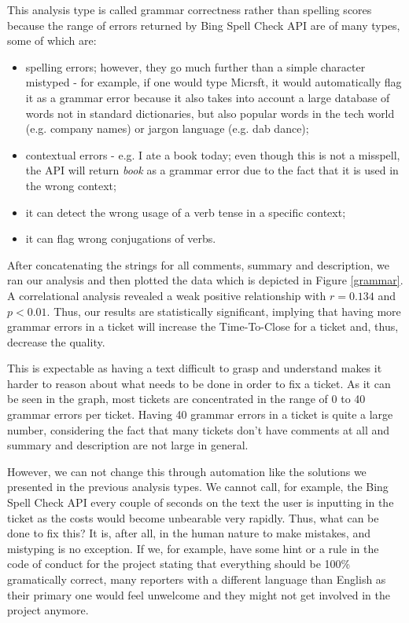 \documentclass{mpaper}
\begin{document}
This analysis type is called grammar correctness rather than spelling scores because the range of errors returned 
by Bing Spell Check API are of many types, some of which are:
\begin{itemize}
  \item spelling errors; however, they go much further than a simple character mistyped - for example,
  if one would type Micrsft, it would automatically flag it as a grammar error because it also takes into account a large 
  database of words not in standard dictionaries, but also popular words in the tech world (e.g. company names) or 
  jargon language (e.g. dab dance);
  \item contextual errors - e.g. I ate a book today; even though this is not a misspell, the API will return \emph{book} as 
  a grammar error due to the fact that it is used in the wrong context;
  \item it can detect the wrong usage of a verb tense in a specific context;
  \item it can flag wrong conjugations of verbs.
\end{itemize}

After concatenating the strings for all comments, summary and description, we ran our analysis and then plotted the 
data which is depicted in Figure \ref{grammar}. A correlational analysis revealed a weak positive
relationship with $r = 0.134$ and $p < 0.01$. Thus, our results are statistically significant, implying that 
having more grammar errors in a ticket will increase the Time-To-Close for a ticket and, thus, decrease the quality. 

This is expectable as having a text difficult to grasp and understand makes it harder to reason about what needs 
to be done in order to fix a ticket. As it can be seen in the graph, most tickets are concentrated in the range of 
0 to 40 grammar errors per ticket. Having 40 grammar errors in a ticket is quite a large number, considering the fact 
that many tickets don't have comments at all and summary and description are not large in general. 

However, we can not change this through automation like the solutions we presented in the previous 
analysis types. We cannot call, for example, the Bing Spell Check API every couple of seconds on the text the user 
is inputting in the ticket as the costs would become unbearable very rapidly. Thus, what can be done to fix this? It is, 
after all, in the human nature to make mistakes, and mistyping is no exception. If we, for example, have some hint or a rule
in the code of conduct for the project stating that everything should be 100\% gramatically correct, many reporters with a 
different language than English as their primary one would feel unwelcome and they might not get involved in the project anymore. 
\end{document}
